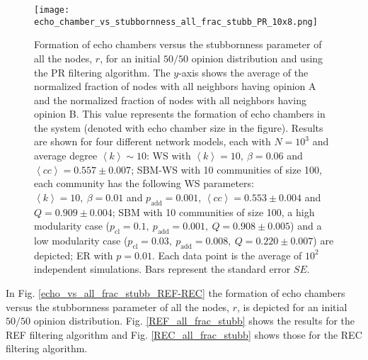 \documentclass[11 pt , letterpaper , twoside , openright]{book}
\begin{document}
\begin{figure}[H]
	\texttt{[image: echo\_chamber\_vs\_stubbornness\_all\_frac\_stubb\_PR\_10x8.png]}
	\captionsetup{format=plain}
	\caption[Formation of echo chambers versus the stubbornness parameter of all the nodes, $r$, for the PR filtering algorithm and an initial $50/50$ opinion distribution.]{Formation of echo chambers versus the stubbornness parameter of all the nodes, $r$, for an initial $50/50$ opinion distribution and using the PR filtering algorithm. The $y$-axis shows the average of the normalized fraction of nodes with all neighbors having opinion A and the normalized fraction of nodes with all neighbors having opinion B. This value represents the formation of echo chambers in the system (denoted with echo chamber size in the figure). Results are shown for four different network models, each with $N=10^3$ and average degree $\left<k\right> \sim 10$: WS with $\left<k\right> =10,\ \beta = 0.06$ and $\left<cc\right> = 0.557 \pm 0.007$; SBM-WS with 10 communities of size 100, each community has the following WS parameters: $\left<k\right> = 10,\ \beta = 0.01$ and $p_{\text{add}} = 0.001$, $\left<cc\right> = 0.553 \pm 0.004$ and $Q = 0.909 \pm 0.004$; SBM with 10 communities of size 100, a high modularity case ($p_{\text{cl}} = 0.1,\ p_{\text{add}} = 0.001,\ Q = 0.908 \pm 0.005$) and a low modularity case ($p_{\text{cl}} = 0.03,\ p_{\text{add}} = 0.008,\ Q = 0.220 \pm 0.007$) are depicted; ER with $p= 0.01$. Each data point is the average of $10^2$ independent simulations. Bars represent the standard error $SE$.}
\label{echo_vs_all_frac_stubb_PR}
\end{figure}
\noindent
In Fig. \ref{echo_vs_all_frac_stubb_REF-REC} the formation of echo chambers versus the stubbornness parameter of all the nodes, $r$, is depicted for an initial $50/50$ opinion distribution. Fig. \ref{REF_all_frac_stubb} shows the results for the REF filtering algorithm and Fig. \ref{REC_all_frac_stubb} shows those for the REC filtering algorithm.
\newpage
\end{document}
